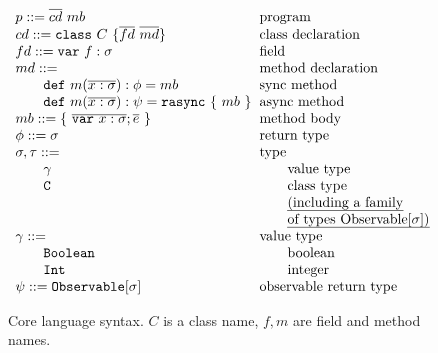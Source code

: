 \documentclass{acm_proc_article-sp}
\newcommand{\gap}{\quad\quad}
\newcommand{\ba}{\begin{array}}
\newcommand{\ea}{\end{array}}
\newcommand{\seq}[1]{\overline{#1}}
\begin{document}
\begin{figure}
  \centering
$\ba[t]{l@{\hspace{2mm}}l}
p    ::=  \seq{cd}~mb                                & \mbox{program}             \\
cd   ::=  \texttt{class}~C~\{\seq{fd}~\seq{md}\}     & \mbox{class declaration}   \\
fd   ::=  \texttt{var}~f: \sigma                     & \mbox{field}               \\
md   ::=                                             & \mbox{method declaration}  \\
\gap \texttt{def}~m(\seq{x: \sigma}): \phi = mb      & \mbox{sync method}         \\
\gap \texttt{def}~m(\seq{x: \sigma}): \psi = \texttt{rasync}~\{~mb~\}  & \mbox{async method} \\
mb   ::=  \{~\seq{\texttt{var}~x: \sigma};\seq{e}~\} & \mbox{method body}         \\
\phi ::=  \sigma                                     & \mbox{return type}         \\
\sigma,\tau ::=                                      & \mbox{type}                \\
\gap \gamma                                          & \gap\mbox{value type}      \\
\gap \texttt{C}                                      & \gap\mbox{class type}      \\
                                                     & \gap\mbox{\em{(including a family}} \\
                                                     & \gap\mbox{\em{of types \texttt{Observable}$[\sigma]$)}} \\
\gamma ::=                                           & \mbox{value type} \\
\gap \texttt{Boolean}                                & \gap\mbox{boolean}         \\
\gap \texttt{Int}                                    & \gap\mbox{integer}         \\
\psi ::= \texttt{Observable$[\sigma]$}               & \mbox{observable return type}    \\
\ea$
  \caption{Core language syntax. $C$ is a class name, $f,m$ are field and
    method names.}
  \label{fig:lang-syntax}
\end{figure}
\end{document}

